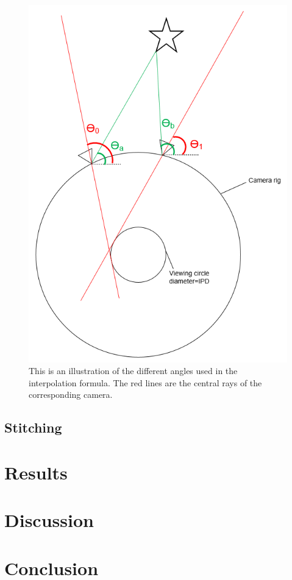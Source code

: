 \documentclass[10pt,twocolumn,letterpaper]{article}
\begin{document}
\begin{figure}[t]
\begin{center}
   \includegraphics[width=0.7\linewidth]{pictures/interpolation.png}
\end{center}
   \caption{This is an illustration of the different angles used in the interpolation formula. The red lines are the central rays of the corresponding camera.}
\label{interpolation}
\end{figure}

\subsection{Stitching}



\section{Results}


\section{Discussion}


\section{Conclusion}







{\small


}
\end{document}
